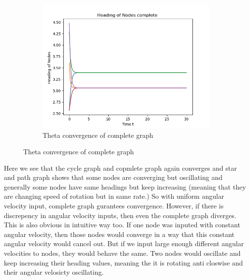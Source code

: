 \documentclass{article}
\begin{document}
\begin{problem}
\begin{figure}[!h]
\begin{subfigure}{0.35\textwidth}
            \includegraphics[width=\textwidth]{./img/p3_complete2.png}
            \caption{Theta convergence of complete graph }
        \end{subfigure}
    \end{figure}
    Here we see that the cycle graph and copmlete graph again converges and star and path graph shows that some nodes are converging but oscillating and generally some nodes have same headings but keep increasing (meaning that they are changing speed of rotation but in same rate.) So with uniform angular velocity input, complete graph gurantees convergence. However, if there is discrepency in angular velocity inputs, then even the complete graph diverges. This is also obvious in intuitive way too. If one node was inputed with constant angular velocity, then those nodes would converge in a way that this constant angular velocity would cancel out. But if we input large enough different angular velocities to nodes, they would behave the same. Two nodes would oscillate and keep increasing their heading values, meaning the it is rotating anti closwise and their angular velosicty oscillating.  
    

\end{problem}
\end{document}
